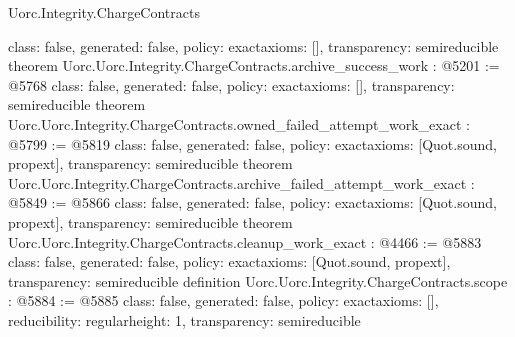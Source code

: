 \begin{lexlean}{Uorc.Integrity.ChargeContracts}
\begin{coremodule}
{  class: false,
  generated: false,
  policy: exact{axioms: []},
  transparency: semireducible
}
theorem Uorc.Uorc.Integrity.ChargeContracts.archive_success_work : @5201 := @5768 {
  class: false,
  generated: false,
  policy: exact{axioms: []},
  transparency: semireducible
}
theorem Uorc.Uorc.Integrity.ChargeContracts.owned_failed_attempt_work_exact : @5799 := @5819 {
  class: false,
  generated: false,
  policy: exact{axioms: [Quot.sound, propext]},
  transparency: semireducible
}
theorem Uorc.Uorc.Integrity.ChargeContracts.archive_failed_attempt_work_exact : @5849 := @5866 {
  class: false,
  generated: false,
  policy: exact{axioms: [Quot.sound, propext]},
  transparency: semireducible
}
theorem Uorc.Uorc.Integrity.ChargeContracts.cleanup_work_exact : @4466 := @5883 {
  class: false,
  generated: false,
  policy: exact{axioms: [Quot.sound, propext]},
  transparency: semireducible
}
definition Uorc.Uorc.Integrity.ChargeContracts.scope : @5884 := @5885 {
  class: false,
  generated: false,
  policy: exact{axioms: []},
  reducibility: regular{height: 1},
  transparency: semireducible
}


\end{coremodule}
\end{lexlean}
